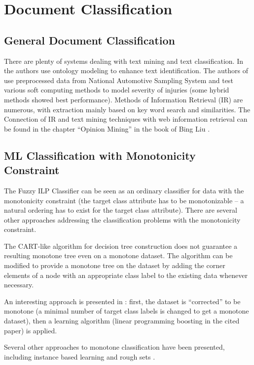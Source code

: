 \section{Document Classification} \label{sec:ch20_doc_classification}

\subsection{General Document Classification}

There are plenty of systems dealing with text mining and text classification. In \citep{biblio:ReYaLiOntoText08} the authors use ontology modeling to enhance text identification. The authors of \citep{biblio:CAP} use preprocessed data from National Automotive Sampling System and test various soft computing methods to model severity of injuries (some hybrid methods showed best performance). Methods of Information Retrieval (IR) are numerous, with extraction mainly based on key word search and similarities. The Connection of IR and text mining techniques with web information retrieval can be found in the chapter ``Opinion Mining'' in the book of Bing Liu \citep{biblio:WebDataMining}. 

\subsection{ML Classification with Monotonicity Constraint}
The Fuzzy ILP Classifier can be seen as an ordinary classifier for data with the monotonicity constraint (the target class attribute has to be monotonizable -- a natural ordering has to exist for the target class attribute). There are several other approaches addressing the classification problems with the monotonicity constraint.

The CART-like algorithm for decision tree construction does not guarantee a resulting monotone tree even on a monotone dataset. The algorithm can be modified \citep{biblio:mon_trees} to provide a monotone tree on the dataset by adding the corner elements of a node with an appropriate class label to the existing data whenever necessary.

An interesting approach is presented in \citep{biblio:mon_transf}: first, the dataset is ``corrected'' to be monotone (a minimal number of target class labels is changed to get a monotone dataset), then a learning algorithm (linear programming boosting in the cited paper) is applied.

Several other approaches to monotone classification have been presented, including instance based learning \citep{biblio:ibl} and rough sets \citep{biblio:rough_sets}.








